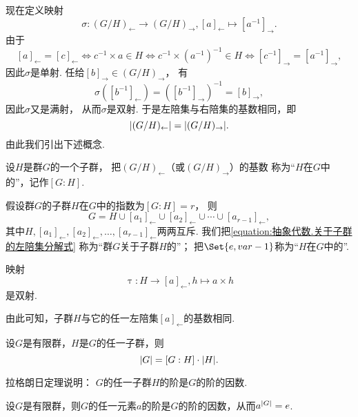 现在定义映射\[
	\sigma\colon (G/H)_\leftarrow \to (G/H)_\rightarrow,
	[a]_\leftarrow \mapsto [a^{-1}]_\rightarrow.
\]
由于\[
	[a]_\leftarrow = [c]_\leftarrow
	\iff
	c^{-1} \times a \in H
	\iff
	c^{-1} \times (a^{-1})^{-1} \in H
	\iff
	[c^{-1}]_\rightarrow = [a^{-1}]_\rightarrow,
\]
因此\(\sigma\)是单射.
任给\([b]_\rightarrow \in (G/H)_\rightarrow\)，
有\[
	\sigma([b^{-1}]_\leftarrow)
	= ([b^{-1}]_\rightarrow)^{-1}
	= [b]_\rightarrow,
\]
因此\(\sigma\)又是满射，
从而\(\sigma\)是双射.
于是左陪集与右陪集的基数相同，即\[
	\abs{(G/H)_\leftarrow} = \abs{(G/H)_\rightarrow}.
\]
由此我们引出下述概念.
\begin{definition}
设\(H\)是群\(G\)的一个子群，
把\((G/H)_\leftarrow\)（或\((G/H)_\rightarrow\)）的基数%
称为“\(H\)在\(G\)中的”，记作\([G:H]\).
\end{definition}

假设群\(G\)的子群\(H\)在\(G\)中的指数为\([G:H]=r\)，
则\begin{equation}\label{equation:抽象代数.关于子群的左陪集分解式}
	G = H \cup [a_1]_\leftarrow \cup [a_2]_\leftarrow \cup \dotsb \cup [a_{r-1}]_\leftarrow,
\end{equation}
其中\(H,[a_1]_\leftarrow,[a_2]_\leftarrow,\dotsc,[a_{r-1}]_\leftarrow\)两两互斥.
我们把\cref{equation:抽象代数.关于子群的左陪集分解式}
称为“群\(G\)关于子群\(H\)的”；
把\(\Set{e,\v{a}{r-1}}\)称为“\(H\)在\(G\)中的”.

\begin{lemma}
映射\[
	\uptau\colon H \to [a]_\leftarrow, h \mapsto a \times h
\]是双射.
\end{lemma}
由此可知，子群\(H\)与它的任一左陪集\([a]_\leftarrow\)的基数相同.

\begin{theorem}[拉格朗日定理]
设\(G\)是有限群，\(H\)是\(G\)的任一子群，则\[
	\abs{G} = [G:H] \cdot \abs{H}.
\]
\end{theorem}
拉格朗日定理说明：
\(G\)的任一子群\(H\)的阶是\(G\)的阶的因数.

\begin{corollary}
设\(G\)是有限群，则\(G\)的任一元素\(a\)的阶是\(G\)的阶的因数，从而\(a^{\abs{G}}=e\).
\end{corollary}
